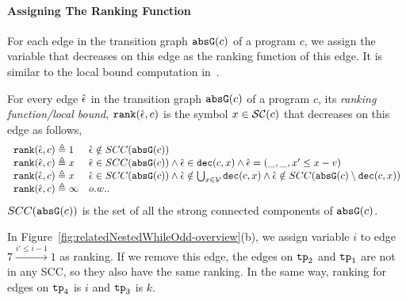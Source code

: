 
  \paragraph{Assigning The Ranking Function}
  For each edge in the transition graph $\mathtt{abs}{\mathtt{G}}(c)$ of a program $c$,
  we assign the variable that decreases on this edge as the ranking function of this edge.
  It is similar to the local bound computation in~\cite{SinnZV17}.
  \begin{defn}
  \label{def:ranking_gen}
  For every edge $\hat{\mathtt{\epsilon}{}}$ in the transition graph $\mathtt{abs}{\mathtt{G}}(c)$ of a program $c$,
  its \emph{ranking function/local bound}, $\mathtt{rank}(\hat{\mathtt{\epsilon}{}}, c)$
  is the symbol $x\in \mathcal{SC}(c)$ that decreases on this edge as follows,
{\small
\[ 
\begin{array}{ll}
  \mathtt{rank}(\hat{\mathtt{\epsilon}{}}, c) \triangleq 1 
  & \hat{\mathtt{\epsilon}{}} \notin SCC(\mathtt{abs}{\mathtt{G}}(c))
  \\
  \mathtt{rank}(\hat{\mathtt{\epsilon}{}}, c) \triangleq x
  & \hat{\mathtt{\epsilon}{}} \in SCC(\mathtt{abs}{\mathtt{G}}(c)) \land \hat{\mathtt{\epsilon}{}} \in \mathtt{dec}(c, x) \land  \hat{\mathtt{\epsilon}{}} = (\_, \_ , x' \leq x - v) \\
  \mathtt{rank}(\hat{\mathtt{\epsilon}{}}, c) \triangleq x
  & \hat{\mathtt{\epsilon}{}} \in SCC(\mathtt{abs}{\mathtt{G}}(c)) \land 
  \hat{\mathtt{\epsilon}{}}  \notin \bigcup_{x \in \mathcal{V}} \mathtt{dec}(c, x)
  \land \hat{\mathtt{\epsilon}{}} \notin SCC(\mathtt{abs}{\mathtt{G}}(c) \setminus \mathtt{dec}(c, x))\\
  \mathtt{rank}(\hat{\mathtt{\epsilon}{}}, c) \triangleq \infty
  & o.w..
\end{array}
\]
}
$SCC(\mathtt{abs}{\mathtt{G}}(c))$ is the set of all the strong connected components of $\mathtt{abs}{\mathtt{G}}(c)$.
  \end{defn}
  In Figure~\ref{fig:relatedNestedWhileOdd-overview}(b), we assign variable $i$ to edge $7 \xrightarrow{i' \leq i - 1} 1$ as ranking.
  If we remove this edge, the edges on $\mathtt{tp}_2$ and $\mathtt{tp}_1$ are not in any SCC, so they also have the same ranking.
In the same way, ranking for edges on $\mathtt{tp}_4$ is $i$ and $\mathtt{tp}_3$ is $k$.

